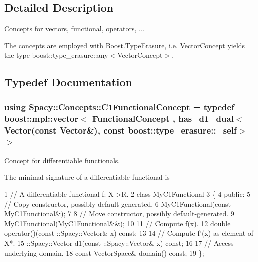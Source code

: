 

\subsection{Detailed Description}
Concepts for vectors, functional, operators, ... 

The concepts are employed with Boost.\+Type\+Erasure, i.\+e. Vector\+Concept yields the type boost\+::type\+\_\+erasure\+::any$<$\+Vector\+Concept$>$. 

\subsection{Typedef Documentation}
\hypertarget{group__ConceptGroup_ga205b55d8291e0f2e143f116cf78bc54f_ga205b55d8291e0f2e143f116cf78bc54f}{}
\subsubsection[{C1\+Functional\+Concept}]{\setlength{\rightskip}{0pt plus 5cm}using {\bf Spacy\+::\+Concepts\+::\+C1\+Functional\+Concept} = typedef boost\+::mpl\+::vector$<$ Functional\+Concept , has\+\_\+d1\+\_\+dual$<$Vector(const Vector\&), const boost\+::type\+\_\+erasure\+::\+\_\+self$>$ $>$}\label{group__ConceptGroup_ga205b55d8291e0f2e143f116cf78bc54f_ga205b55d8291e0f2e143f116cf78bc54f}


Concept for differentiable functionals. 

\label{group__ConceptGroup_ga205b55d8291e0f2e143f116cf78bc54f_C1FunctionalConceptAnchor}%
\hypertarget{group__ConceptGroup_ga205b55d8291e0f2e143f116cf78bc54f_C1FunctionalConceptAnchor}{}%
The minimal signature of a differentiable functional is 
\begin{DoxyCode}
1 // A differentiable functional f: X->R.
2 class MyC1Functional
3 \{
4 public:
5   // Copy constructor, possibly default-generated.
6   MyC1Functional(const MyC1Functional&);
7 
8   // Move constructor, possibly default-generated.
9   MyC1Functional(MyC1Functional&&);
10 
11   // Compute f(x).
12   double operator()(const ::Spacy::Vector& x) const;
13 
14   // Compute f'(x) as element of X*.
15   ::Spacy::Vector d1(const ::Spacy::Vector& x) const;
16 
17   // Access underlying domain.
18   const VectorSpace& domain() const;
19 \};
\end{DoxyCode}


